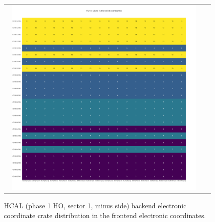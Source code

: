 \begin{figure}[htb]
 \begin{center}
  \begin{tabular}{cc}
   \includegraphics[angle=0,width=0.95\textwidth]{figures/appendix/HO1M_Crate_in_FrontEnd.png}
  \end{tabular}
  \caption{HCAL (phase 1 HO, sector 1, minus side) backend electronic coordinate crate distribution in the frontend electronic coordinates.}
  \label{fig:lmapHO1MCrateFEC}
 \end{center}
\end{figure}
\clearpage

